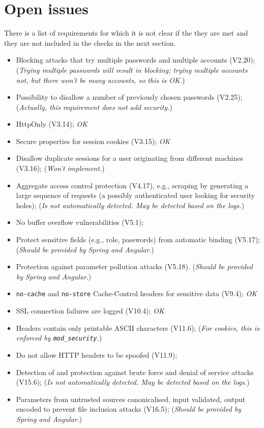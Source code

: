 \documentclass[a4paper]{report}
\begin{document}
\section{Open issues}\label{section:issues}

There is a list of requirements for which it is not clear if the they are met and
they are not included in the checks in the next section.

\begin{itemize}
\item Blocking attacks that try multiple passwords and multiple accounts (V2.20);
(\textit{Trying multiple passwords will result in blocking; trying multiple accounts not, but there won't be many accounts, so this is OK.})
\item Possibility to disallow a number of previously chosen passwords (V2.25);
(\textit{Actually, this requirement does not add security.})
\item HttpOnly (V3.14); \emph{OK}
\item Secure properties for session cookies (V3.15); \emph{OK}
\item Disallow duplicate sessions for a user originating from different machines (V3.16);
(\textit{Won't implement.})
\item Aggregate access control protection  (V4.17), e.g., scraping by generating 
a large sequence of requests (a possibly authenticated user looking for security holes);
(\textit{Is not automatically detected. May be detected based on the logs.})
\item No buffer overflow vulnerabilities (V5.1);
\item Protect sensitive fields (e.g., role, passwords) from automatic binding (V5.17);
(\textit{Should be provided by Spring and Angular}.)
\item Protection against parameter pollution attacks (V5.18).
(\textit{Should be provided by Spring and Angular}.)
\item \texttt{no-cache} and \texttt{no-store} Cache-Control headers for sensitive data (V9.4); \emph{OK}
\item SSL connection failures are logged (V10.4); \emph{OK}
\item Headers contain only printable ASCII characters (V11.6); 
(\textit{For cookies, this is enforced by \texttt{mod\_security}.})
\item Do not allow HTTP headers to be spoofed (V11.9);
\item Detection of and protection against brute force and denial of service attacks (V15.6);
(\textit{Is not automatically detected. May be detected based on the logs.})
\item Parameters from untrusted sources canonicalised, input validated, output encoded
to prevent file inclusion attacks (V16.5);
(\textit{Should be provided by Spring and Angular}.)
\end{itemize}
\end{document}
